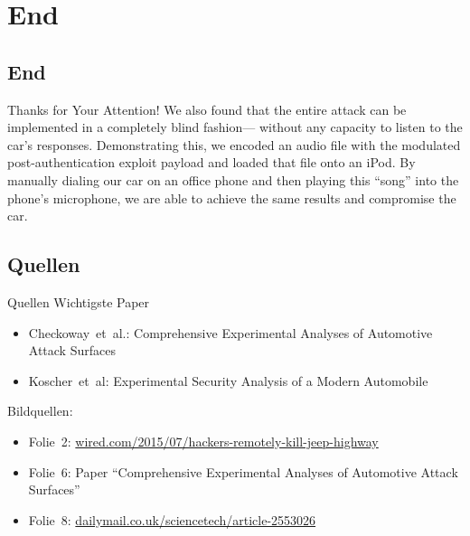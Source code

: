 \section*{End}
\subsection{End}
\begin{frame}{Thanks for Your Attention!}
    We also found that the entire attack can be implemented
in a completely blind fashion— without any
capacity to listen to the car’s responses. Demonstrating
this, we encoded an audio file with the modulated
post-authentication exploit payload and loaded that file
onto an iPod. By manually dialing our car on an office
phone and then playing this \enquote{song} into the phone’s
microphone, we are able to achieve the same results and
compromise the car.
\end{frame}


\subsection{Quellen}
\begin{frame}{Quellen}
    Wichtigste Paper
    \begin{itemize}
        \item Checkoway~et~al.: Comprehensive Experimental Analyses of Automotive Attack Surfaces
        \item Koscher~et~al: Experimental Security Analysis of a Modern Automobile
    \end{itemize}

    Bildquellen:
    \begin{itemize}
        \item Folie~2: \href{http://www.wired.com/2015/07/hackers-remotely-kill-jeep-highway/}{wired.com/2015/07/hackers-remotely-kill-jeep-highway}
        \item Folie~6: Paper \enquote{Comprehensive Experimental Analyses of Automotive Attack Surfaces}
        \item Folie~8: \href{http://www.dailymail.co.uk/sciencetech/article-2553026/The-gadget-hack-CAR-Terrifying-12-tool-remotely-control-headlights-locks-steering-brakes.html}{dailymail.co.uk/sciencetech/article-2553026}
    \end{itemize}
\end{frame}

